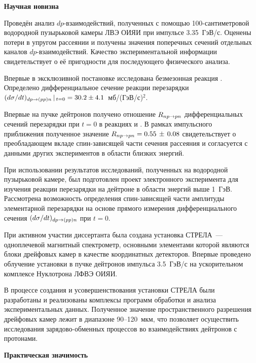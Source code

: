 \vspace{2ex}
\noindent \textbf{Научная новизна}
\begin{list}{}{\leftmargin=1.25em}
\item Проведён анализ $dp$-взаимодействий, полученных с помощью
  100-сантиметровой водородной пузырьковой камеры ЛВЭ ОИЯИ при импульсе
  3.35~ГэВ/с. Оценены потери в упругом рассеянии и получены значения поперечных
  сечений отдельных каналов $dp$-взаимодействий. Качество экспериментальной
  информации свидетельствует о её пригодности для последующего физического
  анализа.
\item Впервые в эксклюзивной постановке исследована безмезонная реакция \dpfrag.
  Определено дифференциальное сечение реакции перезарядки
  $(d\sigma/dt)_{dp \rightarrow (pp)n}\,|\,_{t=0} = 30.2 \pm 4.1$~мб/(ГэВ/с)$^{2}$.
\item Впервые на пучке дейтронов получено отношение $R_{np \rightarrow pn}$ дифференциальных
  сечений перезарядки при $t=0$ в реакциях \dpchex и \np. В рамках импульсного
  приближения полученное значение $R_{np \rightarrow pn} = 0.55\,\pm\,0.08$ свидетельствует о
  преобладающем вкладе спин-зависящей части сечения \np рассеяния и согласуется
  с данными других экспериментов в области близких энергий.
\item При использовании результатов исследований, полученных на водородной
  пузырьковой камере, был подготовлен проект электронного эксперимента для
  изучения реакции перезарядки на дейтроне в области энергий выше 1~ГэВ.
  Рассмотрена возможность определения спин-зависящей части амплитуды
  элементарной перезарядки \np на основе прямого измерения дифференциального
  сечения $(d\sigma/dt)_{dp \rightarrow (pp)n}$ при $t=0$.
\item При активном участии диссертанта была создана установка СТРЕЛА~---
  одноплечевой магнитный спектрометр, основными элементами которой являются
  блоки дрейфовых камер в качестве координатных детекторов. Впервые проведено
  облучение установки в пучке дейтронов импульса 3.5~ГэВ/с на ускорительном
  комплексе Нуклотрона ЛФВЭ ОИЯИ.
\item В процессе создания и усовершенствования установки СТРЕЛА были разработаны
  и реализованы комплексы программ обработки и анализа экспериментальных данных.
  Полученное значение пространственного разрешения дрейфовых камер лежит в
  диапазоне 90--120~мкм, что позволяет осуществить исследования
  зарядово-обменных процессов во взаимодействиях дейтронов с протонами.
\end{list}

\vspace{2ex}
\noindent \textbf{Практическая значимость}

